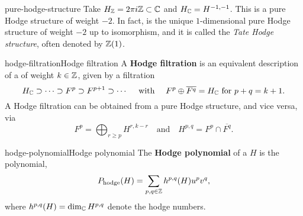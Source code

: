\begin{example}{pure-hodge-structure}
    Take $H_{\mathbb{Z}} = 2 \pi i \mathbb{Z} \subset \mathbb{C}$ and $H_{\mathbb{C}} = H^{-1, -1}$. This is a pure Hodge structure of weight $-2$. In fact, is the unique $1$-dimensional pure Hodge structure of weight $-2$ up to isomorphism, and it is called the \textit{Tate Hodge structure}, often denoted by $\mathbb{Z}(1)$.
\end{example}

\begin{topic}{hodge-filtration}{Hodge filtration}
    A \textbf{Hodge filtration} is an equivalent description of a  of weight $k \in \mathbb{Z}$, given by a filtration
    \[ H_{\mathbb{C}} \supset \cdots \supset F^p \supset F^{p + 1} \supset \cdots \quad \text{ with } \quad F^p \oplus \overline{F^q} = H_{\mathbb{C}} \text{ for } p + q = k + 1 . \]
    A Hodge filtration can be obtained from a pure Hodge structure, and vice versa, via
    \[ F^p = \bigoplus_{r \ge p} H^{r, k - r} \quad \text{and} \quad H^{p, q} = F^p \cap \overline{F^q} . \]
\end{topic}

\begin{topic}{hodge-polynomial}{Hodge polynomial}
    The \textbf{Hodge polynomial} of a  $H$ is the polynomial,
    \[ P_\text{hodge}(H) = \sum_{p, q \in \mathbb{Z}} h^{p, q}(H) u^p v^q , \]
    where $h^{p, q}(H) = \dim_{\mathbb{C}} H^{p, q}$ denote the hodge numbers.
\end{topic}

